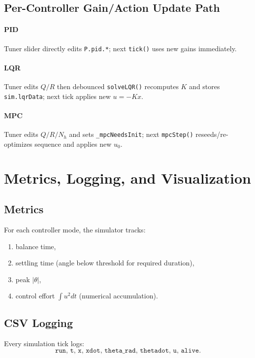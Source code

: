 \documentclass[11pt,a4paper]{article}
\begin{document}
\subsection{Per-Controller Gain/Action Update Path}
\paragraph{PID}
Tuner slider directly edits \texttt{P.pid.*}; next \texttt{tick()} uses new gains immediately.

\paragraph{LQR}
Tuner edits $Q/R$ then debounced \texttt{solveLQR()} recomputes $K$ and stores \texttt{sim.lqrData}; next tick applies new $u=-Kx$.

\paragraph{MPC}
Tuner edits $Q/R/N_h$ and sets \texttt{\_mpcNeedsInit}; next \texttt{mpcStep()} reseeds/re-optimizes sequence and applies new $u_0$.

\section{Metrics, Logging, and Visualization}
\subsection{Metrics}
For each controller mode, the simulator tracks:
\begin{enumerate}[label=\arabic*.]
  \item balance time,
  \item settling time (angle below threshold for required duration),
  \item peak $|\theta|$,
  \item control effort $\int u^2 dt$ (numerical accumulation).
\end{enumerate}

\subsection{CSV Logging}
Every simulation tick logs:
\begin{equation}
\texttt{run, t, x, xdot, theta\_rad, thetadot, u, alive}.
\end{equation}
\end{document}
